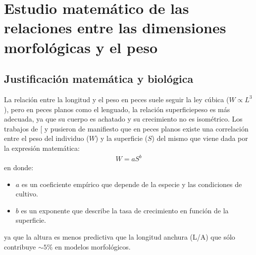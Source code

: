 \documentclass[a4paper,10pt,spanish]{jupyterBook}
\begin{document}
\section{Estudio matemático de las relaciones entre las dimensiones morfológicas y el peso}
\label{\detokenize{content/03/Coeficientes:estudio-matematico-de-las-relaciones-entre-las-dimensiones-morfologicas-y-el-peso}}\label{\detokenize{content/03/Coeficientes::doc}}

\subsection{Justificación matemática y biológica}
\label{\detokenize{content/03/Coeficientes:justificacion-matematica-y-biologica}}
\sphinxAtStartPar
La relación entre la longitud y el peso en peces suele seguir la ley cúbica (\(W\propto L^{3}\)), pero en peces planos como el lenguado, la relación superficie\sphinxhyphen{}peso es más adecuada, ya que su cuerpo es achatado y su crecimiento no es isométrico. Los trabajos de {[}\sphinxhref{https://doi.org/10.1111/j.1439-0426.2006.00805.x}{Froese, 2006}{]} y  pusieron de manifiesto que en peces planos existe una correlación entre el peso del individuo (\(W\)) y la superficie (\(S\)) del mismo que viene dada por la expresión matemática:
\begin{equation}\label{equation:content/03/Coeficientes:eq_peso-superficie}
\begin{split}W=aS^b\end{split}
\end{equation}
\sphinxAtStartPar
en donde:
\begin{itemize}
\item {}
\sphinxAtStartPar
\(a\) es un coeficiente empírico que depende de la especie y las condiciones de cultivo.

\item {}
\sphinxAtStartPar
\(b\) es un exponente que describe la tasa de crecimiento en función de la superficie.

\end{itemize}

\sphinxAtStartPar
ya que la altura es menos predictiva que la longitud \sphinxhyphen{} anchura (L/A) que sólo contribuye \(\sim5\%\) en modelos morfológicos.
\end{document}
